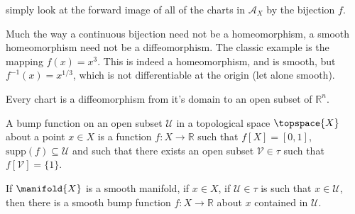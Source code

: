 \documentclass{article}                                                        %
\begin{document}
            simply look at the forward image of all of the charts in
            $\mathcal{A}_{X}$ by the bijection $f$.
            \begin{example}
                Much the way a continuous bijection need not be a homeomorphism,
                a smooth homeomorphism need not be a diffeomorphism. The classic
                example is the mapping $f(x)=x^{3}$. This is indeed a
                homeomorphism, and is smooth, but $f^{\minus{1}}(x)=x^{1/3}$,
                which is not differentiable at the origin (let alone smooth).
            \end{example}
            Every chart is a diffeomorphism from it's domain to an open subset
            of $\mathbb{R}^{n}$.
            \begin{definition}
                A bump function on an open subset $\mathcal{U}$ in a topological
                space $\topspace{X}$ about a point $x\in{X}$ is a function
                $f:X\rightarrow\mathbb{R}$ such that $f[X]=[0,1]$,
                $\textrm{supp}(f)\subseteq\mathcal{U}$ and such that there
                exists an open subset $\mathcal{V}\in\tau$ such that
                $f[\mathcal{V}]=\{1\}$.
            \end{definition}
            \begin{theorem}
                If $\manifold{X}$ is a smooth manifold, if $x\in{X}$, if
                $\mathcal{U}\in\tau$ is such that $x\in\mathcal{U}$, then there
                is a smooth bump function $f:X\rightarrow\mathbb{R}$ about $x$
                contained in $\mathcal{U}$.
            \end{theorem}
\end{document}
